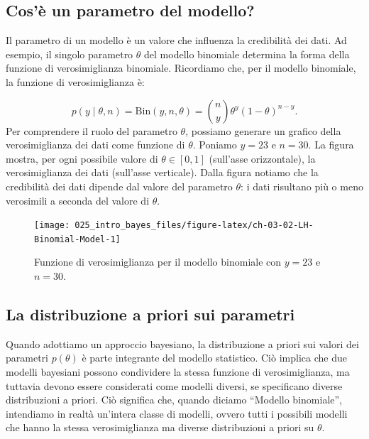 \documentclass[
]{memoir}
\theoremstyle{definition}
\theoremstyle{definition}
\theoremstyle{definition}
\theoremstyle{definition}
\theoremstyle{remark}
\begin{document}
\hypertarget{cosuxe8-un-parametro-del-modello}{%
\subsection{Cos'è un parametro del modello?}\label{cosuxe8-un-parametro-del-modello}}

Il parametro di un modello è un valore che influenza la credibilità dei dati. Ad esempio, il singolo parametro \(\theta\) del modello binomiale determina la forma della funzione di verosimiglianza binomiale. Ricordiamo che, per il modello binomiale, la funzione di verosimiglianza è:

\[ 
p(y \mid \theta, n) = \text{Bin}(y, n, \theta) = \binom{n}{y}\theta^y(1-\theta)^{n-y}. 
\]
Per comprendere il ruolo del parametro \(\theta\), possiamo generare un grafico della verosimiglianza dei dati come funzione di \(\theta\). Poniamo \(y = 23\) e \(n = 30\). La figura mostra, per ogni possibile valore di \(\theta \in [0, 1]\) (sull'asse orizzontale), la verosimiglianza dei dati (sull'asse verticale). Dalla figura notiamo che la credibilità dei dati dipende dal valore del parametro \(\theta\): i dati risultano più o meno verosimili a seconda del valore di \(\theta\).

\begin{figure}

{\centering \texttt{[image: 025\_intro\_bayes\_files/figure-latex/ch-03-02-LH-Binomial-Model-1]} 

}

\caption{Funzione di verosimiglianza per il modello binomiale con $y = 23$ e $n = 30$.}\label{fig:ch-03-02-LH-Binomial-Model}
\end{figure}

\hypertarget{la-distribuzione-a-priori-sui-parametri}{%
\subsection{La distribuzione a priori sui parametri}\label{la-distribuzione-a-priori-sui-parametri}}

Quando adottiamo un approccio bayesiano, la distribuzione a priori sui valori dei parametri \(p(\theta)\) è parte integrante del modello statistico. Ciò implica che due modelli bayesiani possono condividere la stessa funzione di verosimiglianza, ma tuttavia devono essere considerati come modelli diversi, se specificano diverse distribuzioni a priori. Ciò significa che, quando diciamo ``Modello binomiale'', intendiamo in realtà un'intera classe di modelli, ovvero tutti i possibili modelli che hanno la stessa verosimiglianza ma diverse distribuzioni a priori su \(\theta\).
\end{document}
